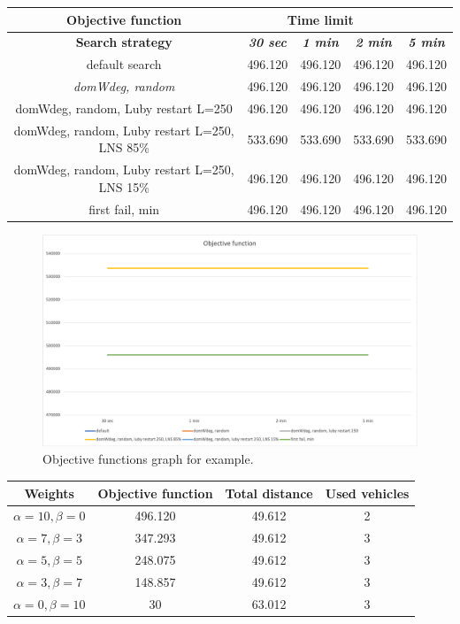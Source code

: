 {
\renewcommand{\arraystretch}{2}
\begin{longtable}[h]{| c | c | c | c | c |}
    \hline
    \textbf{Objective function} & \multicolumn{3}{c}{Time limit} & \\
    \hline
    \textbf{Search strategy} & \textbf{\textit{30 sec}} & \textbf{\textit{1 min}} & \textbf{\textit{2 min}} & \textbf{\textit{5 min}} \\
    \hline
    \endhead
    default search                                & 496.120 & 496.120 & 496.120 & 496.120 \\
    \hline
    \textit{domWdeg, random}                      & 496.120 & 496.120 & 496.120 & 496.120 \\
    \hline
    domWdeg, random, Luby restart L=250           & 496.120 & 496.120 & 496.120 & 496.120 \\
    \hline
    domWdeg, random, Luby restart L=250, LNS 85\% & 533.690 & 533.690 & 533.690 & 533.690 \\
    \hline
    domWdeg, random, Luby restart L=250, LNS 15\% & 496.120 & 496.120 & 496.120 & 496.120 \\
    \hline
    first fail, min                               & 496.120 & 496.120 & 496.120 & 496.120 \\
    \hline
\end{longtable}
}

\begin{figure}[H]
    \centering
    \includegraphics[width=1.0\columnwidth]{../graphs/example-objf.png}
    \caption{Objective functions graph for example.}
\end{figure}

{
\renewcommand{\arraystretch}{2}
\begin{longtable}[h]{| c | c | c | c |}
    \hline
    \textbf{Weights} & \textbf{Objective function} & \textbf{Total distance} & \textbf{Used vehicles} \\
    \hline
    \endhead
    $\alpha = 10, \beta = 0$ & 496.120 & 49.612 & 2 \\
    \hline
    $\alpha = 7, \beta = 3$  & 347.293 & 49.612 & 3 \\
    \hline
    $\alpha = 5, \beta = 5$  & 248.075 & 49.612 & 3 \\
    \hline
    $\alpha = 3, \beta = 7$  & 148.857 & 49.612 & 3 \\
    \hline
    $\alpha = 0, \beta = 10$ &      30 & 63.012 & 3 \\
    \hline
\end{longtable}
}

